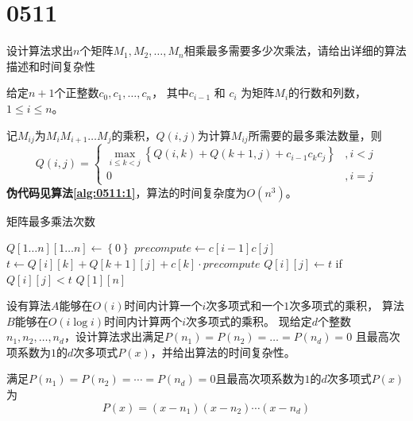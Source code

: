 \section{0511}\label{sec:0511}
\begin{questions}
    \question 设计算法求出$n$个矩阵$M_1, M_2, \dots ,M_n$相乘最多需要多少次乘法，请给出详细的算法描述和时间复杂性

    \begin{solution}
        给定$n+1$个正整数$c_0,c_1, \dots , c_{n}$，
        其中$c_{i-1}$ 和 $c_{i}$ 为矩阵$M_i$的行数和列数，$1 \le i \le n$。

        记$M_{ij}$为$M_iM_{i+1} \dots M_j$的乘积，$Q(i,j)$为计算$M_{ij}$所需要的最多乘法数量，则
        \[
            Q(i,j) = \begin{cases}
                \max_{i \le k < j}{ \left\{ Q(i, k) + Q(k+1, j) + c_{i-1} c_k c_{j} \right\} } & , i < j \\
                0                                                                              & , i = j
            \end{cases}
        \]
        \textbf{伪代码见算法\ref{alg:0511:1}}，算法的时间复杂度为$O(n^3)$。
    \end{solution}

    \begin{algorithm}[!ht]
        \caption{矩阵最多乘法次数}\label{alg:0511:1}
        \begin{algorithmic}[1]
            \State $Q[1 \dots n][1 \dots n] \gets \left\{0\right\}$
            \State $precompute \gets c[i-1]c[j]$
            \State $t \gets Q[i][k] + Q[k+1][j] + c[k] \cdot precompute$
            \State $Q[i][j] \gets t$ if $Q[i][j] < t$
            \EndFor
            \EndFor
            \EndFor
            \State \Return $Q[1][n]$
        \end{algorithmic}
    \end{algorithm}

    \question 设有算法$A$能够在$O(i)$时间内计算一个$i$次多项式和一个$1$次多项式的乘积，
    算法$B$能够在$O(i \log i)$时间内计算两个$i$次多项式的乘积。
    现给定$d$个整数$n_1,n_2, \dots ,n_d$，设计算法求出满足$P(n_1)=P(n_2)= \dots =P(n_d)=0$
    且最高次项系数为$1$的$d$次多项式$P(x)$，并给出算法的时间复杂性。

    \begin{solution}
        满足$P(n_1)=P(n_2)= \cdots =P(n_d)=0$且最高次项系数为$1$的$d$次多项式$P(x)$为
        \[
            P(x) = (x-n_1)(x-n_2) \cdots (x-n_d)
        \]


\end{solution}
\end{questions}
